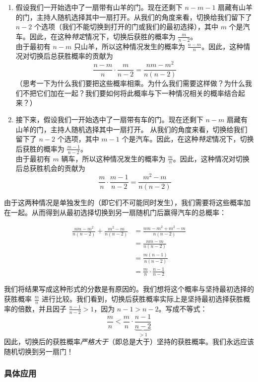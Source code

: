 \begin{enumerate}[label=(\alph*)]
    \item 假设我们一开始选中了一扇带有山羊的门。现在还剩下 $n - m - 1$ 扇藏有山羊的门，主持人随机选择其中一扇打开。从我们的角度来看，切换给我们留下了 $n-2$ 个选项（我们不能切换到打开的门或我们的最初选择），其中 $m$ 个是汽车。因此，在这种\textit{特定}情况下，切换后获胜的概率为 $\frac{m}{n-2}$。\\
    由于最初有 $n - m$ 只山羊，所以这种情况发生的概率为 $\frac{n-m}{n}$。因此，这种情况对切换后总获胜概率的贡献为
    \[\frac{n-m}{n} \cdot \frac{m}{n-2} = \frac{nm-m^2}{n(n-2)}\]
    （思考一下为什么我们要把这些概率相乘。为什么我们需要这样做？为什么我们不把它们加在一起？我们要如何将此概率与下一种情况相关的概率结合起来？）
    \item 接下来，假设我们一开始选中了一扇带有车的门。现在还剩下 $n - m$ 扇藏有山羊的门，主持人随机选择其中一扇打开。 从我们的角度来看，切换给我们留下了 $n-2$ 个选项，其中 $m - 1$ 个是汽车。因此，在这种\textit{特定}情况下，切换后获胜的概率为 $\frac{m-1}{n-2}$。\\
    由于最初有 $m$ 辆车，所以这种情况发生的概率为 $\frac{m}{n}$。因此，这种情况对切换后总获胜机会的贡献为
    \[\frac{m}{n} \cdot \frac{m-1}{n-2} = \frac{m^2-m}{n(n-2)}\]
\end{enumerate}

由于这两种情况是单独发生的（即它们不可能同时发生），我们需要将这些概率加在一起。从而得到从最初选择切换到另一扇随机门后赢得汽车的总概率：

\begin{align*}
    \frac{nm-m^2}{n(n-2)} + \frac{m^2-m}{n(n-2)} &= \frac{nm - m^2 + m^2 - m}{n(n-2)} \\
    &= \frac{nm - m}{n(n-2)} \\
    &= \frac{m(n - 1)}{n(n-2)} \\
    &= \frac{m}{n} \cdot \frac{n-1}{n-2}
\end{align*}

我们将结果写成这种形式的分数是有原因的。我们想将这个概率与坚持最初选择的获胜概率 $\frac{m}{n}$ 进行比较。我们看到，切换后获胜概率实际上是坚持最初选择获胜概率的倍数，并且因子 $\frac{n-1}{n-2} > 1$，因为 $ n - 1 > n - 2$。写成不等式：
\[\frac{m}{n} < \frac{m}{n} \cdot \underbrace{\frac{n-1}{n-2}}_{>1}\]
因此，切换后的获胜概率\textit{严格大于}（即总是大于）坚持的获胜概率。我们永远应该随机切换到另一扇门！

\subsubsection*{具体应用}

